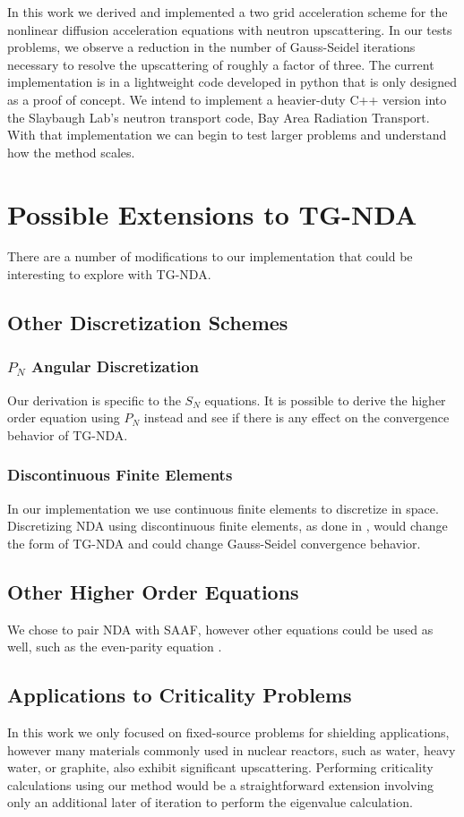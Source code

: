 
In this work we derived and implemented a two grid acceleration scheme for the nonlinear diffusion acceleration equations with neutron upscattering. In our tests problems, we observe a reduction in the number of Gauss-Seidel iterations necessary to resolve the upscattering of roughly a factor of three. The current implementation is in a lightweight code developed in python that is only designed as a proof of concept. We intend to implement a heavier-duty C++ version into the Slaybaugh Lab's neutron transport code, Bay Area Radiation Transport. With that implementation we can begin to test larger problems and understand how the method scales.

\section{Possible Extensions to TG-NDA}
There are a number of modifications to our implementation that could be interesting to explore with TG-NDA. 

\subsection{Other Discretization Schemes}
\subsubsection{$P_N$ Angular Discretization}
Our derivation is specific to the $S_N$ equations. It is possible to derive the higher order equation using $P_N$ instead \cite{zheng-thesis} and see if there is any effect on the convergence behavior of TG-NDA. 
\subsubsection{Discontinuous Finite Elements}
In our implementation we use continuous finite elements to discretize in space. Discretizing NDA using discontinuous finite elements, as done in \cite{Schunert2017}, would change the form of TG-NDA and could change Gauss-Seidel convergence behavior. 
\subsection{Other Higher Order Equations}
We chose to pair NDA with SAAF, however other equations could be used as well, such as the even-parity equation \cite{Noh1996}.
\subsection{Applications to Criticality Problems}
In this work we only focused on fixed-source problems for shielding applications, however many materials commonly used in nuclear reactors, such as water, heavy water, or graphite, also exhibit significant upscattering. Performing criticality calculations using our method would be a straightforward extension involving only an additional later of iteration to perform the eigenvalue calculation. 